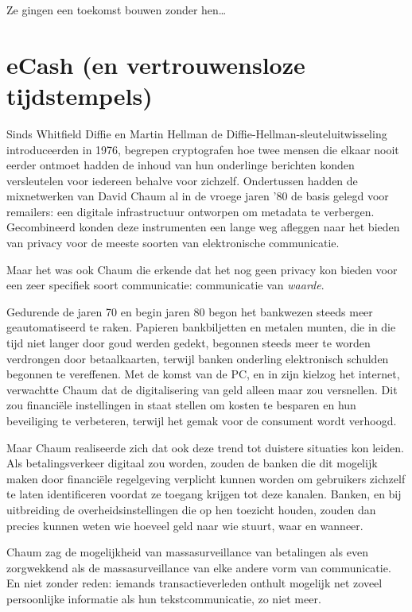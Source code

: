 \documentclass[
  a5paper,
  smalldemyvopaper,11pt,twoside,onecolumn,openright,extrafontsizes,
hidelinks]{memoir}
\begin{document}
Ze gingen een toekomst bouwen zonder hen\ldots{}

\chapter{eCash (en vertrouwensloze
tijdstempels)}\label{ecash-en-vertrouwensloze-tijdstempels}

Sinds Whitfield Diffie en Martin Hellman de
Diffie-Hellman-sleuteluitwisseling introduceerden in 1976, begrepen
cryptografen hoe twee mensen die elkaar nooit eerder ontmoet hadden de
inhoud van hun onderlinge berichten konden versleutelen voor iedereen
behalve voor zichzelf. Ondertussen hadden de mixnetwerken van David
Chaum al in de vroege jaren '80 de basis gelegd voor remailers: een
digitale infrastructuur ontworpen om metadata te verbergen. Gecombineerd
konden deze instrumenten een lange weg afleggen naar het bieden van
privacy voor de meeste soorten van elektronische communicatie.

Maar het was ook Chaum die erkende dat het nog geen privacy kon bieden
voor een zeer specifiek soort communicatie: communicatie van
\emph{waarde}.

Gedurende de jaren 70 en begin jaren 80 begon het bankwezen steeds meer
geautomatiseerd te raken. Papieren bankbiljetten en metalen munten, die
in die tijd niet langer door goud werden gedekt, begonnen steeds meer te
worden verdrongen door betaalkaarten, terwijl banken onderling
elektronisch schulden begonnen te vereffenen. Met de komst van de PC, en
in zijn kielzog het internet, verwachtte Chaum dat de digitalisering van
geld alleen maar zou versnellen. Dit zou financiële instellingen in
staat stellen om kosten te besparen en hun beveiliging te verbeteren,
terwijl het gemak voor de consument wordt verhoogd.

Maar Chaum realiseerde zich dat ook deze trend tot duistere situaties
kon leiden. Als betalingsverkeer digitaal zou worden, zouden de banken
die dit mogelijk maken door financiële regelgeving verplicht kunnen
worden om gebruikers zichzelf te laten identificeren voordat ze toegang
krijgen tot deze kanalen. Banken, en bij uitbreiding de
overheidsinstellingen die op hen toezicht houden, zouden dan precies
kunnen weten wie hoeveel geld naar wie stuurt, waar en wanneer.

Chaum zag de mogelijkheid van massasurveillance van betalingen als even
zorgwekkend als de massasurveillance van elke andere vorm van
communicatie. En niet zonder reden: iemands transactieverleden onthult
mogelijk net zoveel persoonlijke informatie als hun tekstcommunicatie,
zo niet meer.
\end{document}

